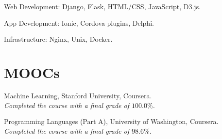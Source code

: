 \documentclass[letterpaper]{article}
\renewenvironment{itemize}{
  \begin{list}{}{
    \setlength{\leftmargin}{1.5em}
  }
}{
  \end{list}
}
\begin{document}
\begin{itemize}
  \item Web Development: Django, Flask, HTML/CSS, JavaScript, D3.js.

  \item App Development: Ionic, Cordova plugins, Delphi.

  \item Infrastructure: Nginx, Unix, Docker.
\end{itemize}

\section*{MOOCs}

\begin{itemize}
  \item Machine Learning, Stanford University, Coursera.\\
  \emph{Completed the course with a final grade of $100.0\%$.}

  \item Programming Languages (Part A), University of Washington, Coursera.\\
  \emph{Completed the course with a final grade of $98.6\%$.}
\end{itemize}


\bigskip

\end{document}
